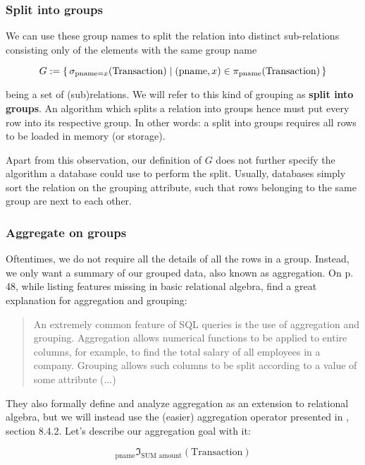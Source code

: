 \subsubsection{Split into groups} \label{Split into groups}

We can use these group names to split the relation into distinct sub-relations consisting
only of the elements with the same group name

\[
    G := \set{\sigma_{\text{pname}=x}(\text{Transaction})
        | (\text{pname}, x) \in \pi_{\text{pname}}(\text{Transaction})}
\]

being a set of (sub)relations. We will refer to this kind of grouping as
\textbf{split into groups}. An algorithm which splits a relation into groups hence
must put every row into its respective group. In other words: a
split into groups requires all rows to be loaded in memory (or storage).

Apart from this observation, our definition of $G$ does not further specify the algorithm
a database could use to perform the split. Usually,
databases simply sort the relation on the grouping attribute, such that
rows belonging to the same group are next to each other.

\subsubsection{Aggregate on groups} \label{Aggregate on groups}

Oftentimes, we do not require all the details of all the rows in a group.
Instead, we only want a summary of our grouped data, also known as aggregation.
On p. 48, while listing features missing in basic relational algebra, \cite{Aren22}
find a great explanation for aggregation and grouping:

\begin{quote}
An extremely common feature of SQL queries
is the use of aggregation and grouping. Aggregation allows numerical functions to be
applied to entire columns, for example, to find the total salary
of all employees in a company. Grouping allows such columns to be split
according to a value of some attribute (...)
\end{quote}
They also formally define and analyze aggregation as an extension to relational algebra,
but we will instead use the (easier) aggregation operator presented in \cite{Elma89},
section 8.4.2. Let's describe our aggregation goal with it:

\[
    _{\text{pname}}\mathfrak{I}_{\text{SUM amount}}(\text{Transaction})
\]

